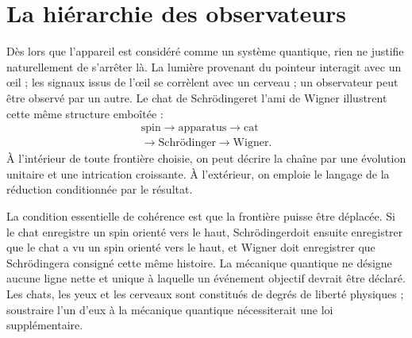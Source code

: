 \begin{classroomqa}
\end{classroomqa}

\begin{classroomqa}
\end{classroomqa}

\section{La hiérarchie des observateurs}

Dès lors que l’appareil est considéré comme un système quantique, rien ne justifie naturellement de s’arrêter là. La lumière provenant du pointeur interagit avec un œil ; les signaux issus de l’œil se corrèlent avec un cerveau ; un observateur peut être observé par un autre. Le chat de Schr\"odingeret l’ami de Wigner illustrent cette même structure emboîtée :
\begin{equation}
\begin{gathered}
\text{spin}
\longrightarrow
\text{apparatus}
\longrightarrow
\text{cat}\\
\longrightarrow
\text{Schr\"odinger}
\longrightarrow
\text{Wigner}.
\end{gathered}
\label{eq:l7-observer-chain}
\end{equation}
À l’intérieur de toute frontière choisie, on peut décrire la chaîne par une évolution unitaire et une intrication croissante. À l’extérieur, on emploie le langage de la réduction conditionnée par le résultat.

La condition essentielle de cohérence est que la frontière puisse être déplacée. Si le chat enregistre un spin orienté vers le haut, Schr\"odingerdoit ensuite enregistrer que le chat a vu un spin orienté vers le haut, et Wigner doit enregistrer que Schr\"odingera consigné cette même histoire. La mécanique quantique ne désigne aucune ligne nette et unique à laquelle un événement objectif devrait être déclaré. Les chats, les yeux et les cerveaux sont constitués de degrés de liberté physiques ; soustraire l’un d’eux à la mécanique quantique nécessiterait une loi supplémentaire.

